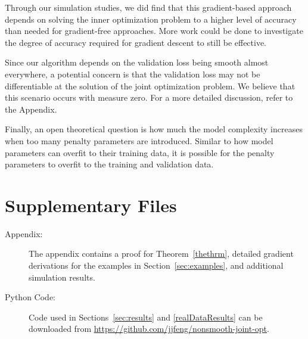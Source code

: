 \documentclass[12pt]{article}
\begin{document}
Through our simulation studies, we did find that this gradient-based approach depends on solving the inner optimization problem to a higher level of accuracy than needed for gradient-free approaches. More work could be done to investigate the degree of accuracy required for gradient descent to still be effective.

Since our algorithm depends on the validation loss being smooth almost everywhere, a potential concern is that the validation loss may not be differentiable at the solution of the joint optimization problem. We believe that this scenario occurs with measure zero. For a more detailed discussion, refer to the Appendix.

Finally, an open theoretical question is how much the model complexity increases when too many penalty parameters are introduced. Similar to how model parameters can overfit to their training data, it is possible for the penalty parameters to overfit to the training and validation data.

\section{Supplementary Files}
\begin{description}
	\item[Appendix:] The appendix contains a proof for Theorem~\ref{thethrm}, detailed gradient derivations for the examples in Section~\ref{sec:examples}, and additional simulation results.
	\item[Python Code:] Code used in Sections~\ref{sec:results} and \ref{realDataResults} can be downloaded from \url{https://github.com/jjfeng/nonsmooth-joint-opt}.
\end{description}



\end{document}
